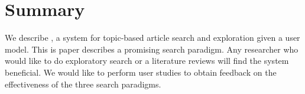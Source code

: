 
\section{Summary}

We describe \system, a system for topic-based article search
and exploration given a user model.
This is paper describes a promising search paradigm.
Any researcher who would like to do exploratory search or a literature 
reviews will find the system beneficial.
We would like to perform user studies to obtain feedback on the 
effectiveness of the three search paradigms.

